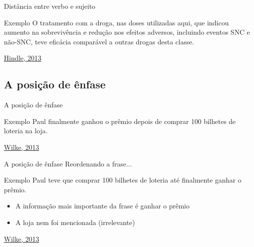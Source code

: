 \documentclass{beamer}
\begin{document}
\begin{frame}{Distância entre verbo e sujeito}
  \begin{exampleblock}{Exemplo}
    \scriptsize
    O \alert{tratamento com a droga}, nas doses utilizadas aqui, que
    indicou aumento na sobrevivência e redução nos efeitos adversos,
    incluindo eventos SNC e não-SNC, \alert{teve} eficácia
    comparável a outras drogas desta classe.
  \end{exampleblock}

  \vfill
  \scriptsize
  \hfill \href{https://web.archive.org/web/20150512001938/http://www.edanzediting.com/blog/reader_expectations_subject_verb_placement}
  {Hindle, 2013}
\end{frame}

\subsection{A posição de ênfase}

\begin{frame}{A posição de ênfase}
  \begin{exampleblock}{Exemplo}
    \footnotesize
    Paul finalmente ganhou o prêmio depois de comprar 100 bilhetes de
    loteria \alert<2->{na loja}.
  \end{exampleblock}


  \vfill
  \scriptsize
  \hfill \href{http://serialmentor.com/blog/2013/9/26/writing-paragraphs-that-make-sensethe-topic-and-the-stress-position}
  {Wilke, 2013}
\end{frame}

\begin{frame}{A posição de ênfase}
  Reordenando a frase...
  \begin{exampleblock}{Exemplo}
    \footnotesize
      Paul teve que comprar 100 bilhetes de loteria até finalmente
      \alert<2->{ganhar o prêmio}.
  \end{exampleblock}
  \begin{itemize}
    \footnotesize
  \item A informação mais importante da frase é \alert{ganhar o
      prêmio}
  \item A loja nem foi mencionada (irrelevante)
  \end{itemize}


  \vfill
  \scriptsize
  \hfill \href{http://serialmentor.com/blog/2013/9/26/writing-paragraphs-that-make-sensethe-topic-and-the-stress-position}
  {Wilke, 2013}
\end{frame}
\end{document}
